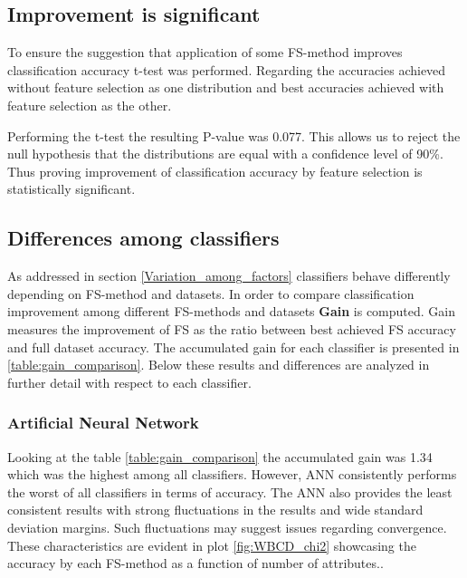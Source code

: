\subsection{Improvement is significant}

To ensure the suggestion that application of some FS-method improves classification accuracy t-test was performed. Regarding the accuracies achieved without feature selection as one distribution and best accuracies achieved with feature selection as the other.

Performing the t-test the resulting P-value was 0.077. This allows us to reject the null hypothesis that the distributions are equal with a confidence level of 90\%. Thus proving improvement of classification accuracy by feature selection is statistically significant.

\subsection{Differences among classifiers}

As addressed in section \ref{Variation_among_factors} classifiers behave differently depending on FS-method and datasets.
In order to compare classification improvement among different FS-methods and datasets \textbf{Gain} is computed. Gain measures the improvement of FS as the ratio between best achieved FS accuracy and full dataset accuracy. The accumulated gain for each classifier is presented in \ref{table:gain_comparison}. Below these results and differences are analyzed in further detail with respect to each classifier.

\begin{table}[hp]
  
  \caption[]%
  {{\small Ranking of which classifiers gained most accuracy when comparing feature selection to full dataset.}}
  \label{table:gain_comparison}
\end{table}

\subsubsection{Artificial Neural Network}

Looking at the table \ref{table:gain_comparison} the accumulated gain was 1.34 which was the highest among all classifiers. However, ANN consistently performs the worst of all classifiers in terms of accuracy. The ANN also provides the least consistent results with strong fluctuations in the results and wide standard deviation margins. Such fluctuations may suggest issues regarding convergence. These characteristics are evident in plot \ref{fig:WBCD_chi2} showcasing the accuracy by each FS-method as a function of number of attributes..

